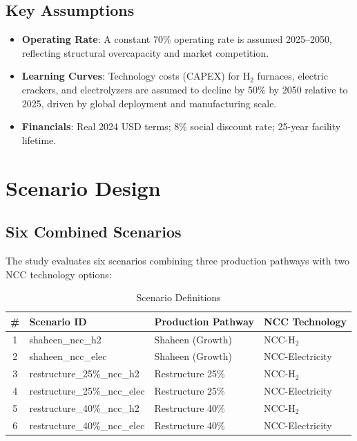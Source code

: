 \documentclass[12pt,a4paper]{article}
\begin{document}
\subsection{Key Assumptions}

\begin{itemize}
    \item \textbf{Operating Rate}: A constant 70\% operating rate is assumed 2025--2050, reflecting structural overcapacity and market competition.
    \item \textbf{Learning Curves}: Technology costs (CAPEX) for H$_2$ furnaces, electric crackers, and electrolyzers are assumed to decline by 50\% by 2050 relative to 2025, driven by global deployment and manufacturing scale.
    \item \textbf{Financials}: Real 2024 USD terms; 8\% social discount rate; 25-year facility lifetime.
\end{itemize}

\section{Scenario Design}

\subsection{Six Combined Scenarios}

The study evaluates six scenarios combining three production pathways with two NCC technology options:

\begin{table}[H]
\centering
\caption{Scenario Definitions}
\begin{tabular}{clll}
\toprule
\# & Scenario ID & Production Pathway & NCC Technology \\
\midrule
1 & shaheen\_ncc\_h2 & Shaheen (Growth) & NCC-H$_2$ \\
2 & shaheen\_ncc\_elec & Shaheen (Growth) & NCC-Electricity \\
3 & restructure\_25\%\_ncc\_h2 & Restructure 25\% & NCC-H$_2$ \\
4 & restructure\_25\%\_ncc\_elec & Restructure 25\% & NCC-Electricity \\
5 & restructure\_40\%\_ncc\_h2 & Restructure 40\% & NCC-H$_2$ \\
6 & restructure\_40\%\_ncc\_elec & Restructure 40\% & NCC-Electricity \\
\bottomrule
\end{tabular}
\end{table}
\end{document}
